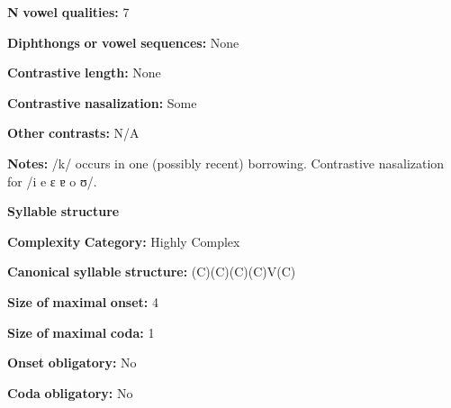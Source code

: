 \documentclass[output=paper]{langsci/langscibook}
\begin{document}
\begin{styleBody}
\textbf{N} \textbf{vowel} \textbf{qualities:} 7
\end{styleBody}

\begin{styleBody}
\textbf{Diphthongs} \textbf{or} \textbf{vowel} \textbf{sequences:} None
\end{styleBody}

\begin{styleBody}
\textbf{Contrastive} \textbf{length:} None
\end{styleBody}

\begin{styleBody}
\textbf{Contrastive} \textbf{nasalization:} Some
\end{styleBody}

\begin{styleBody}
\textbf{Other} \textbf{contrasts:} N/A
\end{styleBody}

\begin{styleBody}
\textbf{Notes:} /k/ occurs in one (possibly recent) borrowing. Contrastive nasalization for /i e ɛ ɐ o ʊ/.
\end{styleBody}

\begin{styleBody}
\textbf{Syllable} \textbf{structure}
\end{styleBody}

\begin{styleBody}
\textbf{Complexity} \textbf{Category:} Highly Complex
\end{styleBody}

\begin{styleBody}
\textbf{Canonical} \textbf{syllable} \textbf{structure:} (C)(C)(C)(C)V(C) \citep[68-76]{Marmion2010}
\end{styleBody}

\begin{styleBody}
\textbf{Size} \textbf{of} \textbf{maximal} \textbf{onset:} 4
\end{styleBody}

\begin{styleBody}
\textbf{Size} \textbf{of} \textbf{maximal} \textbf{coda:} 1
\end{styleBody}

\begin{styleBody}
\textbf{Onset} \textbf{obligatory:} No
\end{styleBody}

\begin{styleBody}
\textbf{Coda} \textbf{obligatory:} No
\end{styleBody}
\end{document}
